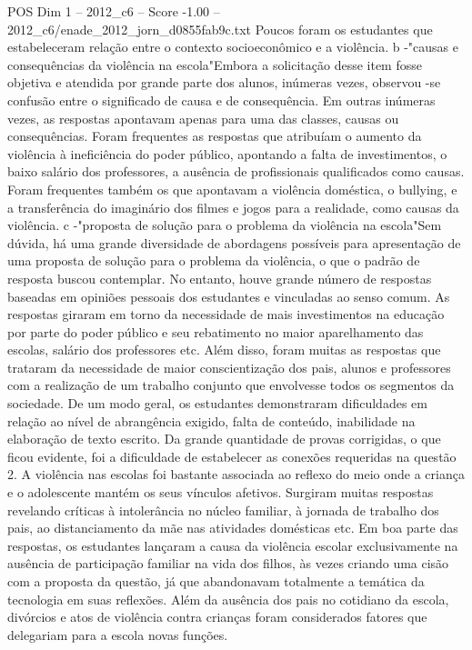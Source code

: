 \begin{textsample}{POS Dim 1 – 2012\_c6 – Score -1.00 – 2012\_c6/enade\_2012\_jorn\_d0855fab9c.txt}
Poucos foram os estudantes que estabeleceram relação entre o contexto socioeconômico e a violência. b -"causas e consequências da violência na escola"Embora a solicitação desse item fosse objetiva e atendida por grande parte dos alunos, inúmeras vezes, observou -se confusão entre o significado de causa e de consequência.
Em outras inúmeras vezes, as respostas apontavam apenas para uma das classes, causas ou consequências.
Foram frequentes as respostas que atribuíam o aumento da violência à ineficiência do poder público, apontando a falta de investimentos, o baixo salário dos professores, a ausência de profissionais qualificados como causas.
Foram frequentes também os que apontavam a violência doméstica, o bullying, e a transferência do imaginário dos filmes e jogos para a realidade, como causas da violência. c -"proposta de solução para o problema da violência na escola"Sem dúvida, há uma grande diversidade de abordagens possíveis para apresentação de uma proposta de solução para o problema da violência, o que o padrão de resposta buscou contemplar.
No entanto, houve grande número de respostas baseadas em opiniões pessoais dos estudantes e vinculadas ao senso comum.
As respostas giraram em torno da necessidade de mais investimentos na educação por parte do poder público e seu rebatimento no maior aparelhamento das escolas, salário dos professores etc.
Além disso, foram muitas as respostas que trataram da necessidade de maior conscientização dos pais, alunos e professores com a realização de um trabalho conjunto que envolvesse todos os segmentos da sociedade.
De um modo geral, os estudantes demonstraram dificuldades em relação ao nível de abrangência exigido, falta de conteúdo, inabilidade na elaboração de texto escrito.
Da grande quantidade de provas corrigidas, o que ficou evidente, foi a dificuldade de estabelecer as conexões requeridas na questão 2.
A violência nas escolas foi bastante associada ao reflexo do meio onde a criança e o adolescente mantém os seus vínculos afetivos.
Surgiram muitas respostas revelando críticas à intolerância no núcleo familiar, à jornada de trabalho dos pais, ao distanciamento da mãe nas atividades domésticas etc.
Em boa parte das respostas, os estudantes lançaram a causa da violência escolar exclusivamente na ausência de participação familiar na vida dos filhos, às vezes criando uma cisão com a proposta da questão, já que abandonavam totalmente a temática da tecnologia em suas reflexões.
Além da ausência dos pais no cotidiano da escola, divórcios e atos de violência contra crianças foram considerados fatores que delegariam para a escola novas funções.

\end{textsample}
